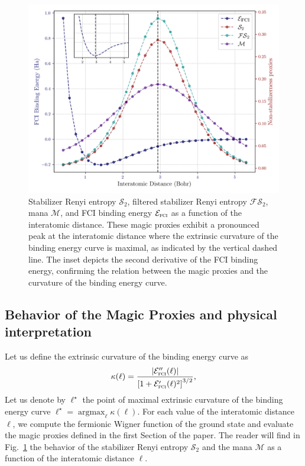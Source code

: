 \documentclass[aps,prl,twocolumn,groupedaddress, reprint,floatfix,nofootinbib,longbibliography]{revtex4-2}
\DeclareMathOperator*{\argmax}{argmax}
\begin{document}
        \begin{figure}[ht]
        \centering
            \includegraphics[width=1.0
            \textwidth]{figures/magic_vs_distance.png}
            \caption{Stabilizer Renyi entropy $\mathcal S_2$, filtered stabilizer Renyi entropy $\mathcal{FS}_2$, mana $\mathcal M$, and FCI binding energy $\mathcal E_\textsc{fci}$ as a function of the interatomic distance. These magic proxies exhibit a pronounced peak at the interatomic distance where the extrinsic curvature of the binding energy curve is maximal, as indicated by the vertical dashed line. The inset depicts the second derivative of the FCI binding energy, confirming the relation between the magic proxies and the curvature of the binding energy curve.}
        \label{fig:magic_vs_distance}
        \end{figure}

    \subsection{Behavior of the Magic Proxies and physical interpretation}

        Let us define the extrinsic curvature of the binding energy curve as
        \begin{equation}
            \kappa(\ell) = \frac{\left|\mathcal E_\textsc{fci}''(\ell)\right|}{\left[1+\mathcal E_\textsc{fci}'(\ell)^2\right]^{3/2}},
        \end{equation}
        Let us denote by $\ell^\star$ the point of maximal extrinsic curvature of the binding energy curve $\ell^\star = \argmax_{\ell} \kappa(\ell)$.
        For each value of the interatomic distance $\ell$, we compute the fermionic Wigner function of the ground state and evaluate the magic proxies defined in the first Section of the paper. The reader will find in Fig.~\ref{fig:magic_vs_distance} the behavior of the stabilizer Renyi entropy $\mathcal S_2$ and the mana $\mathcal M$ as a function of the interatomic distance $\ell$.
\end{document}
